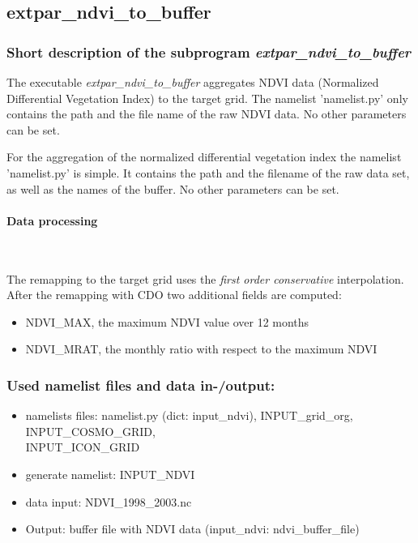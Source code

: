 \documentclass[a4paper,10pt,DIV14,BCOR1cm,titlepage,twoside]{scrartcl}
\begin{document}
\subsection{extpar\_ndvi\_to\_buffer}\label{extpar_ndvi_to_buffer} \subsubsection{Short description of the subprogram \textit{extpar\_ndvi\_to\_buffer}} The executable \textit{extpar\_ndvi\_to\_buffer} aggregates NDVI data (Normalized Differential Vegetation Index) to the target grid. The namelist 'namelist.py' only contains the path and the file name of the raw NDVI data. No other parameters can be set. \par\medskip\noindent For the aggregation of the normalized differential vegetation index the namelist 'namelist.py' is simple. It contains the path and the filename of the raw data set, as well as the names of the buffer. No other parameters can be set. \par\medskip\noindent \paragraph{Data processing} \ \par\medskip\noindent
The remapping to the target grid uses the \textit{first order conservative} interpolation. After the remapping with CDO two additional fields are computed:
\begin{itemize}
  \item NDVI\_MAX, the maximum NDVI value over 12 months
  \item NDVI\_MRAT, the monthly ratio with respect to the maximum NDVI
\end{itemize}

\subsubsection{Used namelist files and data in-/output:}
\begin{itemize}
 \item namelists files: namelist.py (dict: input\_ndvi), INPUT\_grid\_org, INPUT\_COSMO\_GRID, \\
       INPUT\_ICON\_GRID
 \item generate namelist: INPUT\_NDVI
 \item data input: NDVI\_1998\_2003.nc
 \item Output: buffer file with NDVI data (input\_ndvi: ndvi\_buffer\_file)
\end{itemize}
\end{document}
